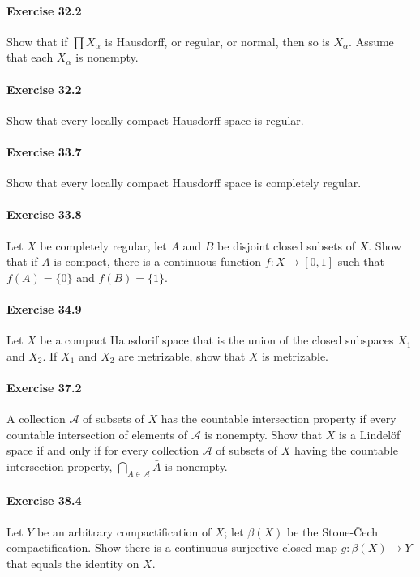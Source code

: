\documentclass{article}
\begin{document}
\paragraph{Exercise 32.2} Show that if $\prod X_\alpha$ is Hausdorff, or regular, or normal, then so is $X_\alpha$. Assume that each $X_\alpha$ is nonempty.

\paragraph{Exercise 32.2} Show that every locally compact Hausdorff space is regular.

\paragraph{Exercise 33.7} Show that every locally compact Hausdorff space is completely regular.

\paragraph{Exercise 33.8} Let $X$ be completely regular, let $A$ and $B$ be disjoint closed subsets of $X$. Show that if $A$ is compact, there is a continuous function $f \colon X \rightarrow [0, 1]$ such that $f(A) = \{0\}$ and $f(B) = \{1\}$.

\paragraph{Exercise 34.9} Let $X$ be a compact Hausdorif space that is the union of the closed subspaces $X_1$ and $X_2$. If $X_1$ and $X_2$ are metrizable, show that $X$ is metrizable.

\paragraph{Exercise 37.2} A collection $\mathcal{A}$ of subsets of $X$ has the countable intersection property if every countable intersection of elements of $\mathcal{A}$ is nonempty. Show that $X$ is a Lindelöf space if and only if for every collection $\mathcal{A}$ of subsets of $X$ having the countable intersection property, $\bigcap_{A \in \mathcal{A}} \bar{A}$ is nonempty.

\paragraph{Exercise 38.4} Let $Y$ be an arbitrary compactification of $X$; let $\beta(X)$ be the Stone-Čech compactification. Show there is a continuous surjective closed map $g \colon \beta(X)\rightarrow Y$ that equals the identity on $X$.
\end{document}
